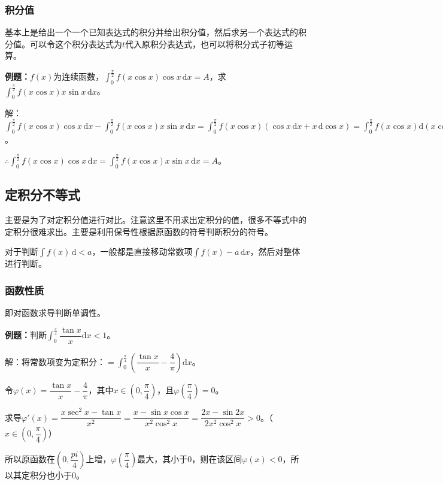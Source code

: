 \documentclass[UTF8, 12pt]{ctexart}
\begin{document}
\subsubsection{积分值}

基本上是给出一个一个已知表达式的积分并给出积分值，然后求另一个表达式的积分值。可以令这个积分表达式为$t$代入原积分表达式，也可以将积分式子初等运算。

\textbf{例题：}$f(x)$为连续函数，$\int_0^\frac{\pi}{2}f(x\cos x)\cos x\,\textrm{d}x=A$，求$\int_0^\frac{\pi}{2}f(x\cos x)x\sin x\,\textrm{d}x$。

解：$\int_0^\frac{\pi}{2}f(x\cos x)\cos x\,\textrm{d}x-\int_0^\frac{\pi}{2}f(x\cos x)x\sin x\,\textrm{d}x=\int_0^\frac{\pi}{2}f(x\cos x)(\cos x\,\textrm{d}x+x\,\textrm{d}\cos x)=\int_0^\frac{\pi}{2}f(x\cos x)\textrm{d}(x\cos x)=F(x\cos x)\vert_0^\frac{\pi}{2}=F(0)-F(0)=0$。

$\therefore\int_0^\frac{\pi}{2}f(x\cos x)\cos x\,\textrm{d}x=\int_0^\frac{\pi}{2}f(x\cos x)x\sin x\,\textrm{d}x=A$。

\subsection{定积分不等式}

主要是为了对定积分值进行对比。注意这里不用求出定积分的值，很多不等式中的定积分很难求出。主要是利用保号性根据原函数的符号判断积分的符号。

对于判断$\int f(x)\,\textrm{d}<a$，一般都是直接移动常数项$\int f(x)-a\,\textrm{d}x$，然后对整体进行判断。

\subsubsection{函数性质}

即对函数求导判断单调性。

\textbf{例题：}判断$\displaystyle{\int_0^\frac{\pi}{4}\dfrac{\tan x}{x}\textrm{d}x<1}$。

解：将常数项变为定积分：$=\displaystyle{\int_0^\frac{\pi}{4}\left(\dfrac{\tan x}{x}-\dfrac{4}{\pi}\right)\textrm{d}x}$。

令$\varphi(x)=\dfrac{\tan x}{x}-\dfrac{4}{\pi}$，其中$x\in\left(0,\dfrac{\pi}{4}\right)$，且$\varphi\left(\dfrac{\pi}{4}\right)=0$。

求导$\varphi'(x)=\dfrac{x\sec^2x-\tan x}{x^2}=\dfrac{x-\sin x\cos x}{x^2\cos^2x}=\dfrac{2x-\sin 2x}{2x^2\cos^2x}>0$。（$x\in\left(0,\dfrac{\pi}{4}\right)$）

所以原函数在$\left(0,\dfrac{pi}{4}\right)$上增，$\varphi\left(\dfrac{\pi}{4}\right)$最大，其小于0，则在该区间$\varphi(x)<0$，所以其定积分也小于0。
\end{document}
